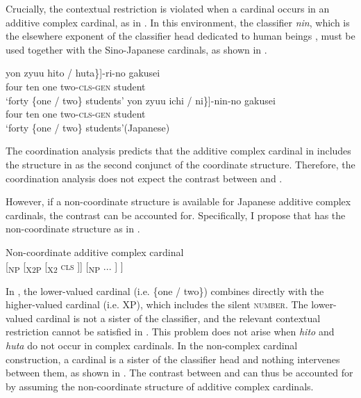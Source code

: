 \documentclass[output=paper]{langscibook}
\begin{document}
Crucially, the contextual restriction is violated when a cardinal occurs in an additive complex cardinal, as in . In this environment, the classifier \textit{nin}, which is the elsewhere exponent of the classifier head dedicated to human beings \citep{Watanabe2010}, must be used together with the Sino-Japanese cardinals, as shown in .

\ea\label{tat:ex:jap.cls.selection.additive}
\ea\label{tat:sec.ada}
\gll \minsp{[} yon zyuu \minsp{\{*} hito / \minsp{*} huta\textnormal{\}]}-ri-no gakusei\\  
     {} four ten {} one {} {} two-\textsc{cls-gen} student\\ 
\glt `forty \{one / two\} students'
\ex\label{tat:sec.adb}
\gll \minsp{[} yon zyuu \minsp{\{} ichi / ni\textnormal{\}]}-nin-no gakusei\\  
     {} four ten {} one {} two-\textsc{cls-gen} student\\ 
\glt `forty \{one / two\} students'\hfill(Japanese)
\z\z

\noindent The coordination analysis predicts that the additive complex cardinal in  includes the structure in  as the second conjunct of the coordinate structure. Therefore, the coordination analysis does not expect the contrast between  and . 

However, if a non-coordinate structure is available for Japanese additive complex cardinals, the contrast can be accounted for. Specifically, I propose that  has the non-coordinate structure as in .

\ea\label{tat:ex:jap.additive.structure}
Non-coordinate additive complex cardinal
\\{[}\textsubscript{NP} [\textsubscript{X2P}  [\textsubscript{X2} \textsc{cls} ]] [\textsubscript{NP} ... ] ]
\z

\noindent In , the lower-valued cardinal (i.e. \{one / two\}) combines directly with the higher-valued cardinal (i.e. XP), which includes the silent \textsc{number}. The lower-valued cardinal is not a sister of the classifier, and the relevant contextual restriction cannot be satisfied in . This problem does not arise when \textit{hito} and \textit{huta} do not occur in complex cardinals. In the non-complex cardinal construction, a cardinal is a sister of the classifier head and nothing intervenes between them, as shown in . The contrast between  and  can thus be accounted for by assuming the non-coordinate structure of additive complex cardinals.
\end{document}
